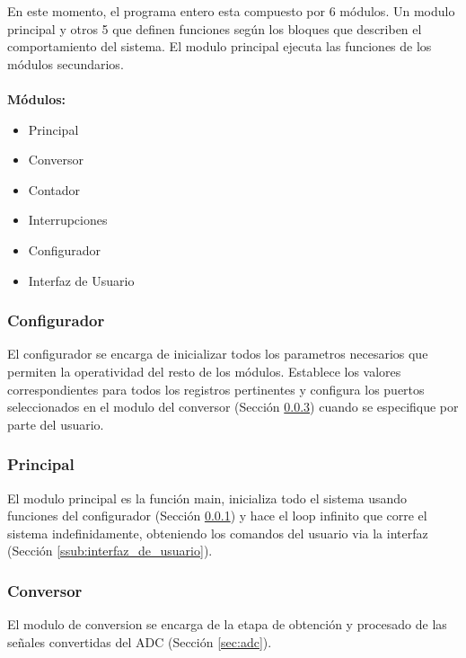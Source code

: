 \documentclass{article}
\theoremstyle{definition}
\theoremstyle{remark}
\begin{document}
En este momento, el programa entero esta compuesto por 6 módulos. Un modulo principal y otros 5 que definen funciones según los bloques que describen el comportamiento del sistema. El modulo principal ejecuta las funciones de los módulos secundarios.

\paragraph{}
\textbf{Módulos:}
\begin{itemize}
  \item Principal
  \item Conversor
  \item Contador
  \item Interrupciones
  \item Configurador
  \item Interfaz de Usuario
\end{itemize}


\subsubsection{Configurador} %
\label{ssub:configurador}

El configurador se encarga de inicializar todos los parametros necesarios que permiten la operatividad del resto de los módulos. Establece los valores correspondientes para todos los registros pertinentes y configura los puertos seleccionados en el modulo del conversor (Sección \ref{ssub:conversor}) cuando se especifique por parte del usuario.
\subsubsection{Principal}
El modulo principal es la función main, inicializa todo el sistema usando funciones del configurador (Sección \ref{ssub:configurador}) y hace el loop infinito que corre el sistema indefinidamente, obteniendo los comandos del usuario via la interfaz (Sección \ref{ssub:interfaz_de_usuario}).


\subsubsection{Conversor} %
\label{ssub:conversor}

El modulo de conversion se encarga de la etapa de obtención y procesado de las señales convertidas del ADC (Secci\'on \ref{sec:adc}).
\end{document}
